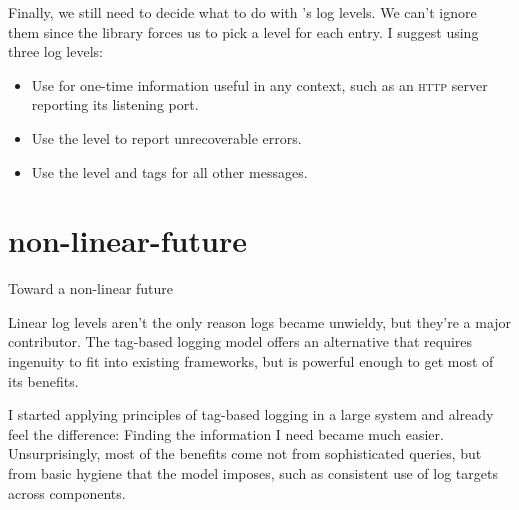 \documentclass{article}
\begin{document}
Finally, we still need to decide what to do with 's log levels.
We can't ignore them since the library forces us to pick a level for each entry.
I suggest using three log levels:

\begin{itemize}
\item Use  for one-time information useful in any context,
  such as an \textsc{http} server reporting its listening port.
\item Use the  level to report unrecoverable errors.
\item Use the  level and tags for all other messages.
\end{itemize}

\section{non-linear-future}{Toward a non-linear future}

Linear log levels aren't the only reason logs became unwieldy, but they're a major contributor.
The tag-based logging model offers an alternative that requires ingenuity to fit into existing frameworks,
but  is powerful enough to get most of its benefits.

I started applying principles of tag-based logging in a large system and already feel the difference:
Finding the information I need became much easier.
Unsurprisingly, most of the benefits come not from sophisticated queries,
but from basic hygiene that the model imposes,
such as consistent use of log targets across components.
\end{document}
